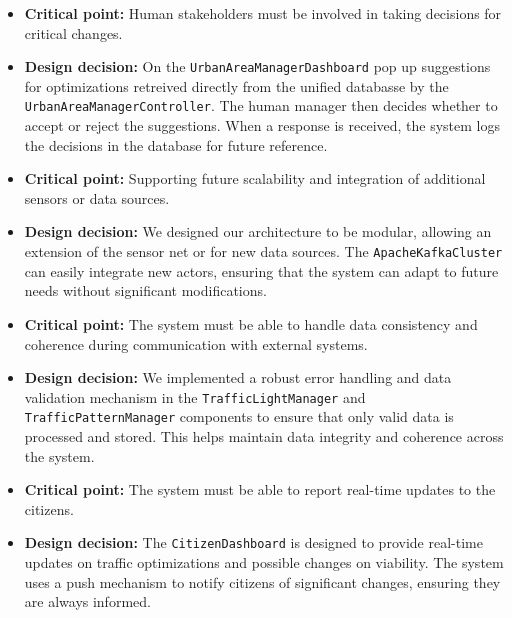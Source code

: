 \documentclass[12pt, a4paper, twoside, openright]{report}
\begin{document}
\begin{itemize}
    \item \textbf{Critical point:} Human stakeholders must be involved in taking decisions for critical changes.
    \item \textbf{Design decision:} On the \texttt{UrbanAreaManagerDashboard} pop up suggestions for optimizations
      retreived directly from the unified databasse by the \texttt{UrbanAreaManagerController}. The human manager then decides
      whether to accept or reject the suggestions. When a response is received, the system logs the decisions in the database for future reference. \\
    
    \item \textbf{Critical point:} Supporting future scalability and integration of additional sensors or data sources.
    \item \textbf{Design decision:} We designed our architecture to be modular, allowing an extension of the sensor net or for new data sources. 
      The \texttt{ApacheKafkaCluster} can easily integrate new actors, ensuring that the system can adapt to future needs without significant modifications. \\
    
    \item \textbf{Critical point:} The system must be able to handle data consistency and coherence during communication with external systems.
    \item \textbf{Design decision:} We implemented a robust error handling and data validation mechanism in the \texttt{TrafficLightManager} and \texttt{TrafficPatternManager} components to ensure that only valid data is processed and stored.
      This helps maintain data integrity and coherence across the system. \\
    
    \item \textbf{Critical point:} The system must be able to report real-time updates to the citizens. 
    \item \textbf{Design decision:} The \texttt{CitizenDashboard} is designed to provide real-time updates on traffic optimizations and possible changes on viability.
     The system uses a push mechanism to notify citizens of significant changes, ensuring they are always informed. \\
    
    \end{itemize}
\end{document}
